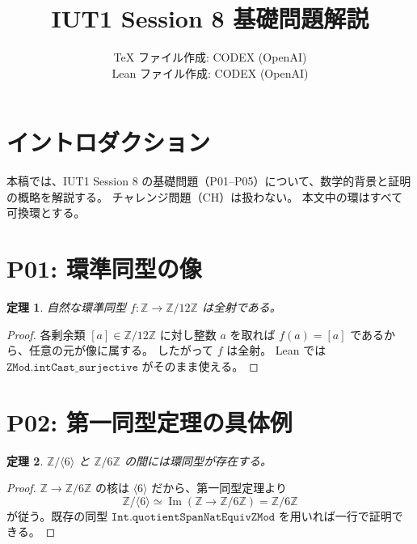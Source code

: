 \documentclass[a4paper,11pt]{ltjsarticle}
\title{IUT1 Session 8 基礎問題解説}
\author{TeX ファイル作成: CODEX (OpenAI)\\Lean ファイル作成: CODEX (OpenAI)}
\date{}
\newtheorem{theorem}{定理}[section]
\theoremstyle{definition}
\theoremstyle{remark}
\begin{document}
\maketitle

\section{イントロダクション}

本稿では、IUT1 Session 8 の基礎問題（P01--P05）について、数学的背景と証明の概略を解説する。
チャレンジ問題（CH）は扱わない。
本文中の環はすべて可換環とする。

\section{P01: 環準同型の像}

\begin{theorem}
自然な環準同型 $f:\mathbb{Z}\to\mathbb{Z}/12\mathbb{Z}$ は全射である。
\end{theorem}

\begin{proof}
各剰余類 $[a]\in\mathbb{Z}/12\mathbb{Z}$ に対し整数 $a$ を取れば $f(a)=[a]$ であるから、任意の元が像に属する。
したがって $f$ は全射。
Lean では $\texttt{ZMod.intCast\_surjective}$ がそのまま使える。
\end{proof}

\section{P02: 第一同型定理の具体例}

\begin{theorem}
$\mathbb{Z}/\langle 6\rangle$ と $\mathbb{Z}/6\mathbb{Z}$ の間には環同型が存在する。
\end{theorem}

\begin{proof}
$\mathbb{Z}\to\mathbb{Z}/6\mathbb{Z}$ の核は $\langle6\rangle$ だから、第一同型定理より
\[
\mathbb{Z}/\langle 6\rangle \simeq \operatorname{Im}(\mathbb{Z}\to\mathbb{Z}/6\mathbb{Z}) = \mathbb{Z}/6\mathbb{Z}
\]
が従う。既存の同型 $ \texttt{Int.quotientSpanNatEquivZMod} $ を用いれば一行で証明できる。
\end{proof}

\begin{center}
\end{center}
\end{document}
